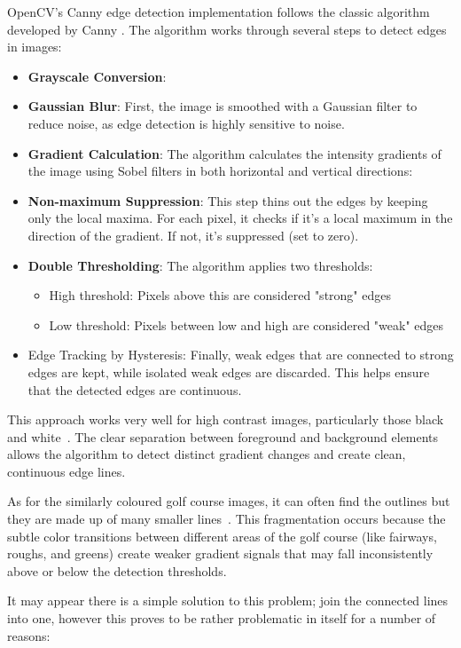 \documentclass[final]{cmpreport_02}
\begin{document}
OpenCV's Canny edge detection implementation follows the classic algorithm developed by Canny \citep{canny1986computational}.
The algorithm works through several steps to detect edges in images:
\begin{itemize}
	\item \textbf{Grayscale Conversion}: 
	\item \textbf{Gaussian Blur}: First, the image is smoothed with a Gaussian filter to reduce noise, as edge detection is highly sensitive to noise.
	\item \textbf{Gradient Calculation}: The algorithm calculates the intensity gradients of the image using Sobel filters in both horizontal and vertical directions:
	\item \textbf{Non-maximum Suppression}: This step thins out the edges by keeping only the local maxima. For each pixel, it checks if it's a local maximum in the direction of the gradient. If not, it's suppressed (set to zero).
	\item \textbf{Double Thresholding}: The algorithm applies two thresholds:
	      \begin{itemize}
		      \item High threshold: Pixels above this are considered "strong" edges
		      \item Low threshold: Pixels between low and high are considered "weak" edges
	      \end{itemize}
	\item Edge Tracking by Hysteresis: Finally, weak edges that are connected to strong edges are kept, while isolated weak edges are discarded. This helps ensure that the detected edges are continuous.
\end{itemize}
This approach works very well for high contrast images, particularly those black and white~. The clear separation between foreground and background elements allows the algorithm to detect distinct gradient changes and create clean, continuous edge lines.

As for the similarly coloured golf course images, it can often find the outlines but they are made up of many smaller lines~. This fragmentation occurs because the subtle color transitions between different areas of the golf course (like fairways, roughs, and greens) create weaker gradient signals that may fall inconsistently above or below the detection thresholds.

It may appear there is a simple solution to this problem; join the connected lines into one, however this proves to be rather problematic in itself for a number of reasons:
\end{document}
